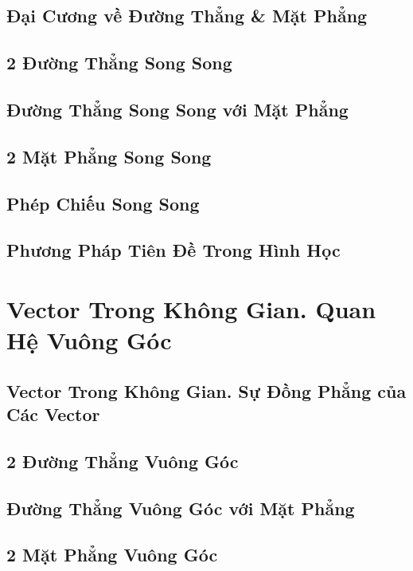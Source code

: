 \documentclass[oneside]{book}
\numberwithin{equation}{section}
\begin{document}
\section{Đại Cương về Đường Thẳng \& Mặt Phẳng}

\section{2 Đường Thẳng Song Song}

\section{Đường Thẳng Song Song với Mặt Phẳng}

\section{2 Mặt Phẳng Song Song}

\section{Phép Chiếu Song Song}

\section{Phương Pháp Tiên Đề Trong Hình Học}


\chapter{Vector Trong Không Gian. Quan Hệ Vuông Góc}

\section{Vector Trong Không Gian. Sự Đồng Phẳng của Các Vector}

\section{2 Đường Thẳng Vuông Góc}

\section{Đường Thẳng Vuông Góc với Mặt Phẳng}

\section{2 Mặt Phẳng Vuông Góc}
\end{document}
